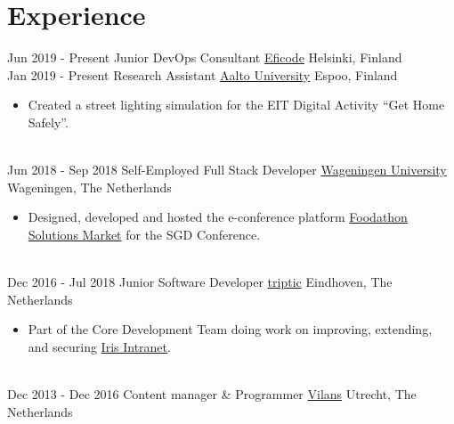 \documentclass[a4paper]{twentysecondcv} %
\begin{document}
\section{Experience}
\begin{twentyshort} %
    \twentyitem
    	{Jun 2019 -}
		{Present}
        {Junior DevOps Consultant}
		{\href{https://eficode.com}{Eficode}}
        {Helsinki, Finland}
        {%
        }
        \\
    \twentyitem
    	{Jan 2019 -}
		{Present}
        {Research Assistant}
		{\href{https://aalto.fi}{Aalto University}}
        {Espoo, Finland}
        {
        \begin{itemize}
			\item Created a street lighting simulation for the EIT Digital Activity ``Get Home Safely''.
        \end{itemize}
        }
        \\
    \twentyitem
    	{Jun 2018 -}
		{Sep 2018}
        {Self-Employed Full Stack Developer}
		{\href{https://wur.nl}{Wageningen University}}
        {Wageningen, The Netherlands}
        {
        \begin{itemize}
			\item Designed, developed and hosted the e-conference platform \href{https://foodathon.github.io/}{Foodathon Solutions Market} for the SGD Conference.
        \end{itemize}
        }
        \\
    \twentyitem
    	{Dec 2016 -}
		{Jul 2018}
        {Junior Software Developer}
		{\href{http://triptic.nl}{triptic}}
        {Eindhoven, The Netherlands}
        {
        \begin{itemize}
            \item Part of the Core Development Team doing work on improving, extending, and securing \href{https://www.irisintranet.com/}{Iris Intranet}.
        \end{itemize}
        }
        \\
	\twentyitem
    	{Dec 2013 -}
		{Dec 2016}
		{Content manager \& Programmer}
		{\href{http://www.vilans.nl/}{Vilans}}
        {Utrecht, The Netherlands}
        {}
\end{twentyshort}
\end{document}
